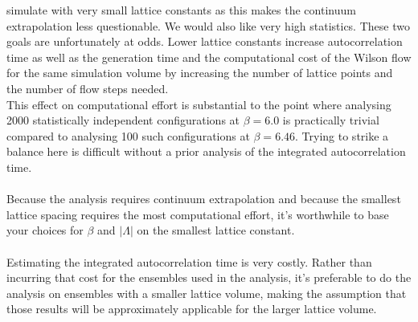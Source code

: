 \documentclass[a4paper,10pt]{article}
\begin{document}
simulate with very small lattice constants as this makes the continuum extrapolation less questionable. We would also like very high statistics. These two goals are unfortunately at odds. Lower lattice constants increase autocorrelation time as well as the generation time and the computational cost of the Wilson flow for the same simulation volume by increasing the number of lattice points and the number of flow steps needed.\\This effect on computational effort is substantial to the point where analysing 2000 statistically independent configurations at $\beta=6.0$ is practically trivial compared to analysing 100 such configurations at $\beta=6.46$. Trying to strike a balance here is difficult without a prior analysis of the integrated autocorrelation time.\\\\Because the analysis requires continuum extrapolation and because the smallest lattice spacing requires the most computational effort, it's worthwhile to base your choices for $\beta$ and $|\Lambda|$ on the smallest lattice constant.\\\\Estimating the integrated autocorrelation time is very costly. Rather than incurring that cost for the ensembles used in the analysis, it's preferable to do the analysis on ensembles with a smaller lattice volume, making the assumption that those results will be approximately applicable for the larger lattice volume. 
\end{document}
